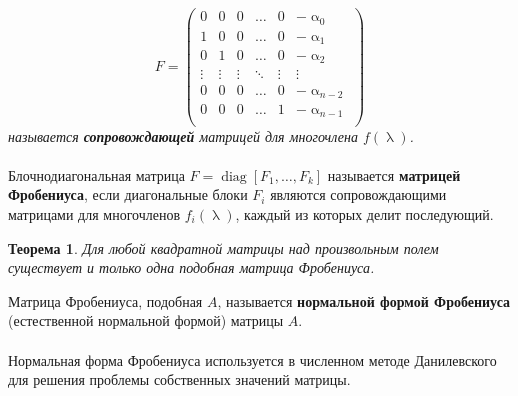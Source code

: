 \documentclass[a4paper, 12pt]{report}
\numberwithin{equation}{section}
\renewcommand{\alpha}{\upalpha}
\renewcommand{\lambda}{\uplambda}
\newcommand{\diag}{\operatorname{diag}}
\newtheorem*{theorem}{Теорема}
\begin{document}
	$$F = \begin{pmatrix}
		0 & 0 & 0 & \dots & 0 & -\alpha_0\\
		1 & 0 & 0 & \dots & 0 & -\alpha_1\\
		0 & 1 & 0 & \dots & 0 & -\alpha_2\\
		\vdots & \vdots & \vdots & \ddots & \vdots & \vdots\\
		0 & 0 & 0 & \dots & 0 & -\alpha_{n-2}\\
		0 & 0 & 0 & \dots & 1 & -\alpha_{n-1}\\
	\end{pmatrix}$$ \textit{называется \textbf{сопровождающей} матрицей для многочлена $f(\lambda)$.}\\\\
	{Блочнодиагональная матрица $F = \diag [F_1,\dots,F_k]$ называется \textbf{матрицей Фробениуса}, если диагональные блоки $F_i$ являются сопровождающими матрицами для многочленов $f_i(\lambda)$, каждый из которых делит последующий.}
	\begin{theorem}
		Для любой квадратной матрицы над произвольным полем существует и только одна подобная матрица Фробениуса.
	\end{theorem}
	\noindent
	{Матрица Фробениуса, подобная $A$, называется \textbf{нормальной формой Фробениуса} (естественной нормальной формой) матрицы $A$.}
	\\\\
	Нормальная форма Фробениуса используется в численном методе Данилевского для решения проблемы собственных значений матрицы.
\end{document}
